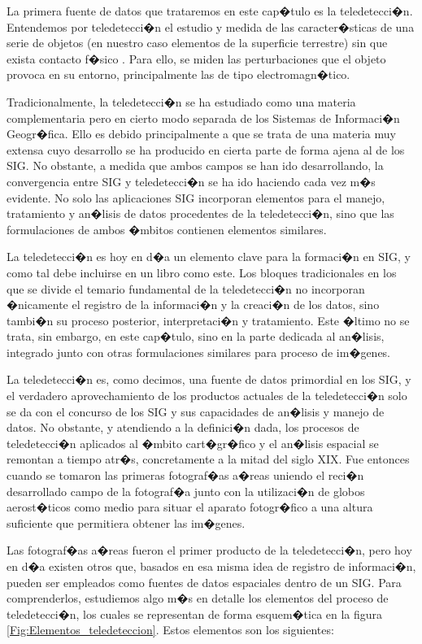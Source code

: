 La primera fuente de datos que trataremos en este cap�tulo es la teledetecci�n. Entendemos por teledetecci�n el estudio y medida de las caracter�sticas de una serie de objetos (en nuestro caso elementos de la superficie terrestre) sin que exista contacto f�sico \cite{Curran1991Longman,Lillesand1997Wiley,Chuvieco1996Rialp}. Para ello, se miden las perturbaciones que el objeto provoca en su entorno, principalmente las de tipo electromagn�tico.

Tradicionalmente, la teledetecci�n se ha estudiado como una materia complementaria pero en cierto modo separada de los Sistemas de Informaci�n Geogr�fica. Ello es debido principalmente a que se trata de una materia muy extensa cuyo desarrollo se ha producido en cierta parte de forma ajena al de los SIG. No obstante, a medida que ambos campos se han ido desarrollando, la convergencia entre SIG y teledetecci�n se ha ido haciendo cada vez m�s evidente. No solo las aplicaciones SIG incorporan elementos para el manejo, tratamiento y an�lisis de datos procedentes de la teledetecci�n, sino que las formulaciones de ambos �mbitos contienen elementos similares.

La teledetecci�n es hoy en d�a un elemento clave para la formaci�n en SIG, y como tal debe incluirse en un libro como este. Los bloques tradicionales en los que se divide el temario fundamental de la teledetecci�n no incorporan �nicamente el registro de la informaci�n y la creaci�n de los datos, sino tambi�n su proceso posterior, interpretaci�n y tratamiento. Este �ltimo no se trata, sin embargo, en este cap�tulo, sino en la parte dedicada al an�lisis, integrado junto con otras formulaciones similares para proceso de im�genes.

La teledetecci�n es, como decimos, una fuente de datos primordial en los SIG, y el verdadero aprovechamiento de los productos actuales de la teledetecci�n solo se da con el concurso de los SIG y sus capacidades de an�lisis y manejo de datos. No obstante, y atendiendo a la definici�n dada, los procesos de teledetecci�n aplicados al �mbito cart�gr�fico y el an�lisis espacial se remontan a tiempo atr�s, concretamente a la mitad del siglo XIX. Fue entonces cuando se tomaron las primeras fotograf�as a�reas uniendo el reci�n desarrollado campo de la fotograf�a junto con la utilizaci�n de globos aerost�ticos como medio para situar el aparato fotogr�fico a una altura suficiente que permitiera obtener las im�genes.

Las fotograf�as a�reas fueron el primer producto de la teledetecci�n, pero hoy en d�a existen otros  que, basados en esa misma idea de registro de informaci�n, pueden ser empleados como fuentes de datos espaciales dentro de un SIG. Para comprenderlos, estudiemos algo m�s en detalle los elementos del proceso de teledetecci�n, los cuales se representan de forma esquem�tica en la figura \ref{Fig:Elementos_teledeteccion}. Estos elementos son los siguientes:

